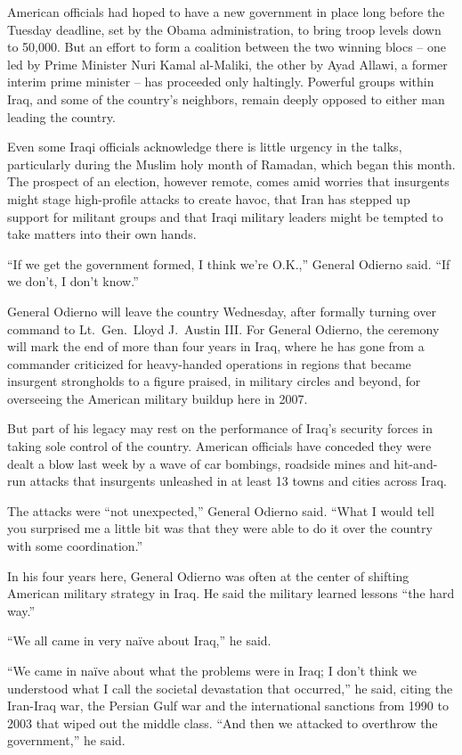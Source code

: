 ﻿\documentclass[12pt]{article}
\begin{document}
American officials had hoped to have a new government in place long before the Tuesday deadline, set
by the Obama administration, to bring troop levels down to 50,000. But an effort to form a coalition
between the two winning blocs -- one led by Prime Minister Nuri Kamal al-Maliki, the other by Ayad
Allawi, a former interim prime minister -- has proceeded only haltingly. Powerful groups within
Iraq, and some of the country's neighbors, remain deeply opposed to either man leading the country.

Even some Iraqi officials acknowledge there is little urgency in the talks, particularly during the
Muslim holy month of Ramadan, which began this month. The prospect of an election, however remote,
comes amid worries that insurgents might stage high-profile attacks to create havoc, that Iran has
stepped up support for militant groups and that Iraqi military leaders might be tempted to take
matters into their own hands.

``If we get the government formed, I think we're O.K.,'' General Odierno said. ``If we don't, I
don't know.''

General Odierno will leave the country Wednesday, after formally turning over command to
Lt.~Gen.~Lloyd J.~Austin III. For General Odierno, the ceremony will mark the end of more than four
years in Iraq, where he has gone from a commander criticized for heavy-handed operations in regions
that became insurgent strongholds to a figure praised, in military circles and beyond, for
overseeing the American military buildup here in 2007.

But part of his legacy may rest on the performance of Iraq's security forces in taking sole control
of the country. American officials have conceded they were dealt a blow last week by a wave of car
bombings, roadside mines and hit-and-run attacks that insurgents unleashed in at least 13 towns and
cities across Iraq.

The attacks were ``not unexpected,'' General Odierno said. ``What I would tell you surprised me a
little bit was that they were able to do it over the country with some coordination.''

In his four years here, General Odierno was often at the center of shifting American military
strategy in Iraq. He said the military learned lessons ``the hard way.''

``We all came in very na\"ive about Iraq,'' he said.

``We came in na\"ive about what the problems were in Iraq; I don't think we understood what I call
the societal devastation that occurred,'' he said, citing the Iran-Iraq war, the Persian Gulf war
and the international sanctions from 1990 to 2003 that wiped out the middle class. ``And then we
attacked to overthrow the government,'' he said.
\end{document}
